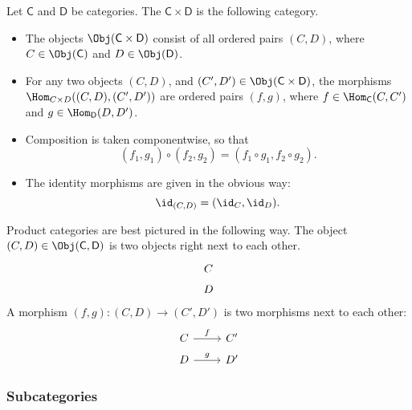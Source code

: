 \documentclass[notes.tex]{subfiles}
\begin{document}
\begin{definition}
  \label{def:productcategory}
  Let $\mathsf{C}$ and $\mathsf{D}$ be categories. The  $\mathsf{C} \times \mathsf{D}$ is the following category.
  \begin{itemize}
    \item The objects $\Obj(\mathsf{C} \times \mathsf{D})$ consist of all ordered pairs $(C, D)$, where $C \in \Obj(\mathsf{C})$ and $D \in \Obj(\mathsf{D})$.

    \item For any two objects $(C, D)$, and $(C', D') \in \Obj(\mathsf{C} \times \mathsf{D})$,
      the morphisms $\Hom_{C \times D}((C, D), (C', D'))$ are ordered pairs $(f,g)$, where $f \in \Hom_{\mathsf{C}}(C, C')$ and $g \in \Hom_{\mathsf{D}}(D, D')$.

    \item Composition is taken componentwise, so that
      \begin{equation*}
        (f_{1}, g_{1}) \circ (f_{2},g_{2}) = (f_{1} \circ g_{1}, f_{2} \circ g_{2}).
      \end{equation*}

    \item The identity morphisms are given in the obvious way:
      \begin{equation*}
        \id_{(C,D)} = (\id_{C}, \id_{D}).
      \end{equation*}
  \end{itemize}
\end{definition}

Product categories are best pictured in the following way. The object $(C, D) \in \Obj(\mathsf{C}, \mathsf{D})$ is two objects right next to each other.
\begin{equation*}
  \begin{tikzcd}[row sep=tiny]
    C \\
    D
  \end{tikzcd}
\end{equation*}
A morphism $(f, g)\colon (C, D) \to (C', D')$ is two morphisms next to each other:
\begin{equation*}
  \begin{tikzcd}[row sep=tiny]
    C
    \arrow[r, "f"]
    & C'
    \\
    D
    \arrow[r, "g"]
    & D'
  \end{tikzcd}
\end{equation*}


\subsubsection{Subcategories}
\end{document}
